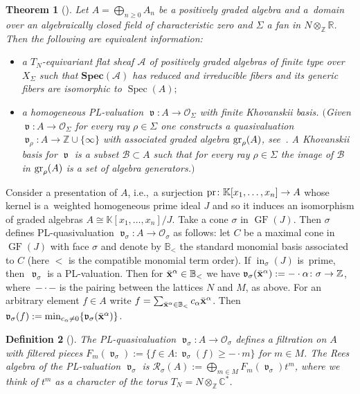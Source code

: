 \documentclass[pdftex]{sigma}%
\newtheorem{Theorem}{Theorem}[section]
\newtheorem{Definition}[Theorem]{Definition}
\numberwithin{equation}{section}
\DeclareMathOperator{\init}{in}
\DeclareMathOperator{\GF}{GF}
\DeclareMathOperator{\val}{\mathfrak v}
\begin{document}
\begin{Theorem}[{\cite[Theorem~1.1]{KM-toricbundles}}]
Let $A=\bigoplus_{n\ge 0}A_n$ be a positively graded algebra and a~domain over an algebraically closed field of characteristic zero and $\Sigma$ a fan in $N\otimes_{\mathbb Z}\mathbb R$.
Then the following are equivalent information:
\begin{itemize}\itemsep=0pt
 \item[$(i)$] a $T_N$-equivariant flat sheaf $\mathcal A$ of positively graded algebras of finite type over $X_\Sigma$ such that $\mathbf{Spec}(\mathcal A)$ has reduced and irreducible fibers and its generic fibers are isomorphic to $\operatorname{Spec}(A);$
\item[$(ii)$] a homogeneous PL-valuation $\val\colon A\to \mathcal O_{\Sigma}$ with finite Khovanskii basis. $($Given $\val\colon A\to \mathcal O_{\Sigma}$ for every ray $\rho\in \Sigma$ one constructs a quasivaluation $\val_\rho\colon A\to \mathbb Z\cup \{\infty\}$ with associated graded algebra ${\rm gr}_{\rho}(A)$, see~{\rm \cite[Section~4.1]{KM-toricbundles}}. A {\it Khovanskii basis} for $\val$ is a subset $\mathcal B\subset A$ such that for every ray $\rho\in \Sigma$ the image of $\mathcal B$ in ${\rm gr}_{\rho}(A)$ is a set of algebra generators.$)$
\end{itemize}
\end{Theorem}

Consider a presentation of $A$, i.e.,~a surjection ${\rm pr}\colon \mathbb K[x_1,\dots,x_n]\to A$ whose kernel is a~weig\-hted homogeneous prime ideal $J$ and so it induces an isomorphism of graded algebras $A\cong \mathbb K[x_1,\dots,x_n]/J$.
Take a cone $\sigma$ in $\GF(J)$.
Then $\sigma$ defines PL-quasivaluation $\val_{\sigma}\colon A\to \mathcal O_\sigma$ as follows:
let $C$ be a maximal cone in $\GF(J)$ with face $\sigma$ and denote by $\mathbb B_<$ the standard monomial basis associated to $C$ (here $<$ is the compatible monomial term order).
If $\init_\sigma(J)$ is~prime, then~$\val_{\sigma}$ is a PL-valuation.
Then for $\bar{\bf x}^\alpha\in \mathbb B_<$ we have $\val_{\sigma}(\bar{\bf x}^\alpha):= -\cdot \alpha\colon \sigma\to \mathbb Z$, where~$-\cdot -$ is the pairing between the lattices $N$ and $M$, as above.
For an arbitrary element $f\in A$ write $f=\sum_{\bar{\bf x}^\alpha\in \mathbb B_<} c_\alpha \bar{\bf x}^\alpha$.
Then $\val_\sigma(f):=\min_{c_\alpha\not =0}\{\val_\sigma(\bar{\bf x}^\alpha)\}$.

\begin{Definition}[\cite{KM-toricbundles}]
The PL-quasivaluation $\val_\sigma\colon A\to\mathcal O_\sigma$ defines a {\it filtration} on $A$ with filtered pieces
$F_m(\val_\sigma):=\{f\in A\colon \val_\sigma(f)\ge -\cdot m \}$ for $m\in M$.
The {\it Rees algebra} of the PL-va\-lu\-ation $\val_\sigma$ is $\mathcal R_\sigma(A):=\bigoplus_{m\in M}F_m(\val_\sigma)t^m$, where we think of $t^m$ as a character of the torus $T_N=N\otimes_{\mathbb Z}\mathbb C^*$.
\end{Definition}
\end{document}
